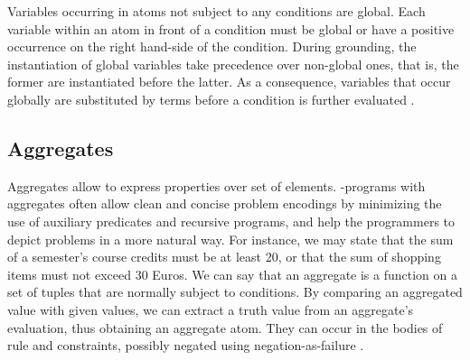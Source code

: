 \documentclass[14pt,a4paper, titlepage]{article}
\begin{document}
Variables occurring in atoms not subject to any conditions are global. Each variable within an atom in front of a condition must be global or have a positive occurrence on the right hand-side of the condition. During grounding, the instantiation of global variables take precedence over non-global ones, that is, the former are instantiated before the latter. As a consequence, variables that occur globally are substituted by terms before a condition is further evaluated \cite{pott}.    

\subsection{Aggregates}
\label{aggregates}
Aggregates allow to express properties over set of elements. \hex{}-programs with aggregates often allow clean and concise problem encodings by minimizing the use of auxiliary predicates and recursive programs, and help the programmers to depict problems in a more natural way. For instance, we may state that the sum of a semester's course credits must be at least 20, or that the sum of shopping items must not exceed 30 Euros. We can say that an aggregate is a function on a set of tuples that are normally subject to conditions. By comparing an aggregated value with given values, we can extract a truth value from an aggregate's evaluation, thus obtaining an aggregate atom. They can occur in the bodies of rule and constraints, possibly negated using negation-as-failure \cite{pott}.
\end{document}
